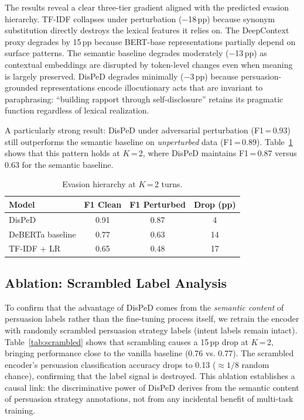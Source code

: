\documentclass[11pt,a4paper]{article}
\begin{document}
The results reveal a clear three-tier gradient aligned with the predicted evasion hierarchy. TF-IDF collapses under perturbation ($-$18\,pp) because synonym substitution directly destroys the lexical features it relies on. The DeepContext proxy degrades by 15\,pp because BERT-base representations partially depend on surface patterns. The semantic baseline degrades moderately ($-$13\,pp) as contextual embeddings are disrupted by token-level changes even when meaning is largely preserved. DisPeD degrades minimally ($-$3\,pp) because persuasion-grounded representations encode illocutionary acts that are invariant to paraphrasing: ``building rapport through self-disclosure'' retains its pragmatic function regardless of lexical realization.

A particularly strong result: DisPeD under adversarial perturbation (F1\,=\,0.93) still outperforms the semantic baseline on \emph{unperturbed} data (F1\,=\,0.89). Table~\ref{tab:evasion_k2} shows that this pattern holds at $K$\,=\,2, where DisPeD maintains F1\,=\,0.87 versus 0.63 for the semantic baseline.

\begin{table}[t]
\centering
\caption{Evasion hierarchy at $K$\,=\,2 turns.}
\label{tab:evasion_k2}
\begin{tabular}{lccc}
\toprule
\textbf{Model} & \textbf{F1 Clean} & \textbf{F1 Perturbed} & \textbf{Drop (pp)} \\
\midrule
DisPeD & 0.91 & 0.87 & 4 \\
DeBERTa baseline & 0.77 & 0.63 & 14 \\
TF-IDF + LR & 0.65 & 0.48 & 17 \\
\bottomrule
\end{tabular}
\end{table}

\subsection{Ablation: Scrambled Label Analysis}
\label{sec:ablation}

To confirm that the advantage of DisPeD comes from the \emph{semantic content} of persuasion labels rather than the fine-tuning process itself, we retrain the encoder with randomly scrambled persuasion strategy labels (intent labels remain intact). Table~\ref{tab:scrambled} shows that scrambling causes a 15\,pp drop at $K$\,=\,2, bringing performance close to the vanilla baseline (0.76 vs. 0.77). The scrambled encoder's persuasion classification accuracy drops to 0.13 ($\approx 1/8$ random chance), confirming that the label signal is destroyed. This ablation establishes a causal link: the discriminative power of DisPeD derives from the semantic content of persuasion strategy annotations, not from any incidental benefit of multi-task training.
\end{document}

